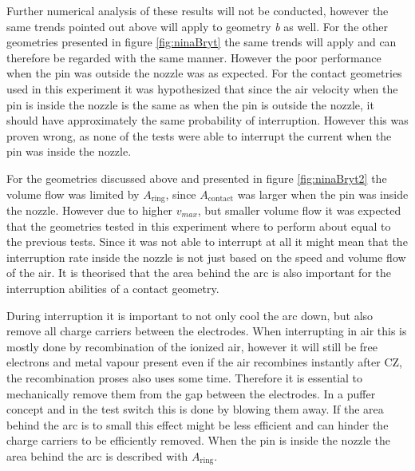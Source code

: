 \documentclass[10pt,a4paper,twoside]{article}
\begin{document}
Further numerical analysis of these results will not be conducted, however the same trends pointed out above will apply to geometry \textit{b} as well. For the other geometries presented in figure \ref{fig:ninaBryt} the same trends will apply and can therefore be regarded with the same manner. However the poor performance when the pin was outside the nozzle was as expected. For the contact geometries used in this experiment it was hypothesized that since the air velocity when the pin is inside the nozzle is the same as when the pin is outside the nozzle, it should have approximately the same probability of interruption. However this was proven wrong, as none of the tests were able to interrupt the current when the pin was inside the nozzle.

For the geometries discussed above and presented in figure \ref{fig:ninaBryt2} the volume flow was limited by $A_\mathrm{{ring}}$, since $A_\mathrm{{contact}}$ was larger when the pin was inside the nozzle. However due to higher $v_{max}$, but smaller volume flow it was expected that the geometries tested in this experiment where to perform about equal to the previous tests. Since it was not able to interrupt at all it might mean that the interruption rate inside the nozzle is not just based on the speed and volume flow of the air. It is theorised that the area behind the arc is also important for the interruption abilities of a contact geometry.

During interruption it is important to not only cool the arc down, but also remove all charge carriers between the electrodes. When interrupting in air this is mostly done by recombination of the ionized air, however it will still be free electrons and metal vapour present even if the air recombines instantly after CZ, the recombination proses also uses some time. Therefore it is essential to mechanically remove them from the gap between the electrodes. In a puffer concept and in the test switch this is done by blowing them away. If the area behind the arc is to small this effect might be less efficient and can hinder the charge carriers to be efficiently removed. When the pin is inside the nozzle the area behind the arc is described with $A_\mathrm{{ring}}$.
\end{document}
